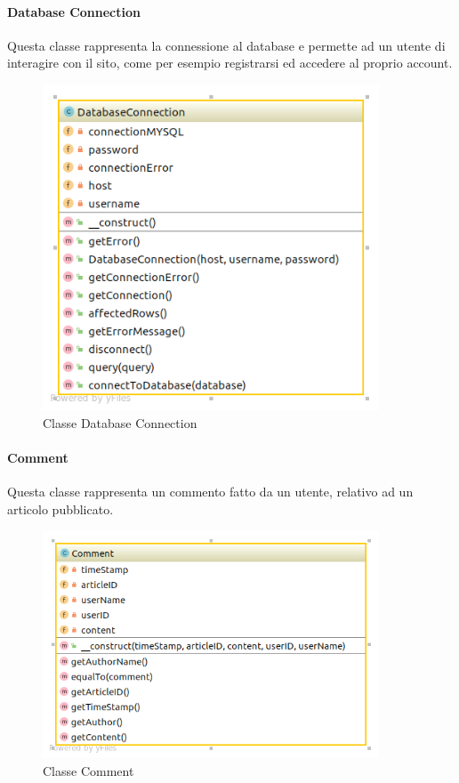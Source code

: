 \paragraph{Database Connection} Questa classe rappresenta la connessione al database e permette ad un utente di interagire con il sito, come per esempio registrarsi ed accedere al proprio account.
\begin{figure}[H]
	\begin{center}
		\includegraphics[width=10cm]{img/DatabaseConnection.png}
		\caption{Classe Database Connection}
	\end{center}
\end{figure}

\paragraph{Comment} Questa classe rappresenta un commento fatto da un utente, relativo ad un articolo pubblicato.
\begin{figure}[H]
	\begin{center}
		\includegraphics[width=10cm]{img/Comment.png}
		\caption{Classe Comment}
	\end{center}
\end{figure}
\pagebreak
